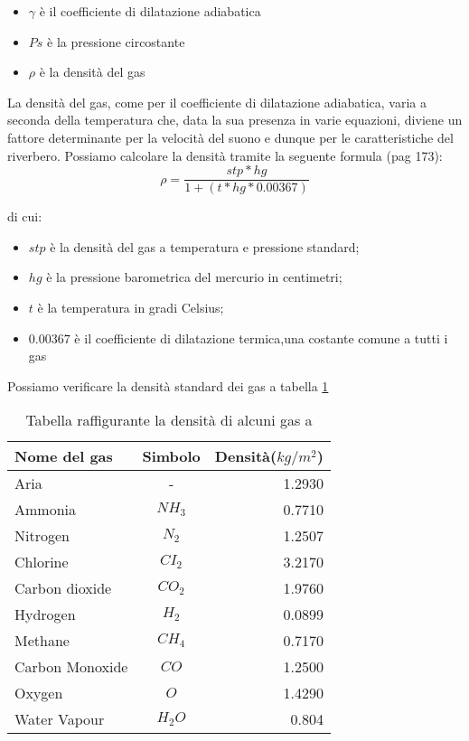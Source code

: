 \begin{itemize}
      \item $\gamma$ è il coefficiente di dilatazione adiabatica 
      \item $Ps$ è la pressione circostante
      \item $\rho$ è la densità del gas
\end{itemize}

La densità del gas, come per il coefficiente di dilatazione adiabatica, varia a seconda della temperatura che, data la sua presenza in varie equazioni, diviene un fattore determinante per la velocità del suono e dunque per le caratteristiche del riverbero.
Possiamo calcolare la densità tramite la seguente formula (pag 173):
\begin{equation}
\rho = \frac{stp*hg}{1+(t*hg*0.00367)}
\end{equation}

di cui:

\begin{itemize}
      \item $stp$ è la densità del gas a temperatura e pressione standard;
      \item $hg$ è la pressione barometrica del mercurio in centimetri;
      \item $t$ è la temperatura in gradi Celsius;
      \item $0.00367$ è il  coefficiente di dilatazione termica,una costante comune a tutti i gas
\end{itemize}

Possiamo verificare la densità standard dei gas a tabella \ref{tab:dens}

\bigskip
\begin{table}[h]
\centering
\caption{Tabella raffigurante la densità di alcuni gas a \emph{}}
\label{tab:dens}
\begin{tabular}{lcr}
\toprule
Nome del gas & Simbolo & Densità($kg/m^2$) \\
\midrule
Aria & - & 1.2930 \\
Ammonia & $NH_3$ & 0.7710 \\
Nitrogen & $N_2$ & 1.2507 \\
Chlorine & $CI_2$ & 3.2170 \\
Carbon dioxide & $CO_2$ & 1.9760 \\
Hydrogen & $H_2$ & 0.0899 \\
Methane & $CH_4$ & 0.7170 \\
Carbon Monoxide & $CO$ & 1.2500 \\
Oxygen & $O$ &1.4290 \\
Water Vapour & $H_2O$ & 0.804 \\
\bottomrule
\end{tabular}
\end{table}
\smallskip


